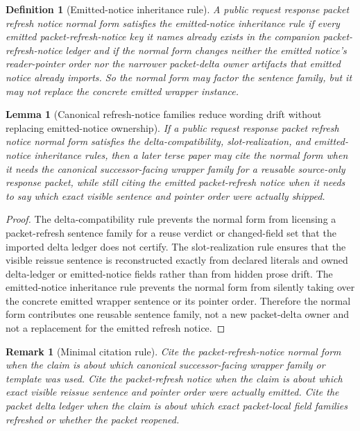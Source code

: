 \documentclass[11pt]{article}
\newtheorem{definition}{Definition}
\newtheorem{lemma}{Lemma}
\newtheorem{remark}{Remark}
\begin{document}
\begin{definition}[Emitted-notice inheritance rule]
A public request response packet refresh notice normal form satisfies the \emph{emitted-notice inheritance rule} if every emitted packet-refresh-notice key it names already exists in the companion packet-refresh-notice ledger and if the normal form changes neither the emitted notice's reader-pointer order nor the narrower packet-delta owner artifacts that emitted notice already imports.
So the normal form may factor the sentence family, but it may not replace the concrete emitted wrapper instance.
\end{definition}

\begin{lemma}[Canonical refresh-notice families reduce wording drift without replacing emitted-notice ownership]
If a public request response packet refresh notice normal form satisfies the delta-compatibility, slot-realization, and emitted-notice inheritance rules, then a later terse paper may cite the normal form when it needs the canonical successor-facing wrapper family for a reusable source-only response packet, while still citing the emitted packet-refresh notice when it needs to say which exact visible sentence and pointer order were actually shipped.
\end{lemma}

\begin{proof}
The delta-compatibility rule prevents the normal form from licensing a packet-refresh sentence family for a reuse verdict or changed-field set that the imported delta ledger does not certify.
The slot-realization rule ensures that the visible reissue sentence is reconstructed exactly from declared literals and owned delta-ledger or emitted-notice fields rather than from hidden prose drift.
The emitted-notice inheritance rule prevents the normal form from silently taking over the concrete emitted wrapper sentence or its pointer order.
Therefore the normal form contributes one reusable sentence family, not a new packet-delta owner and not a replacement for the emitted refresh notice.\qedhere
\end{proof}

\begin{remark}[Minimal citation rule]
Cite the packet-refresh-notice normal form when the claim is about \emph{which canonical successor-facing wrapper family or template was used}.
Cite the packet-refresh notice when the claim is about \emph{which exact visible reissue sentence and pointer order were actually emitted}.
Cite the packet delta ledger when the claim is about \emph{which exact packet-local field families refreshed or whether the packet reopened}.
\end{remark}
\end{document}
